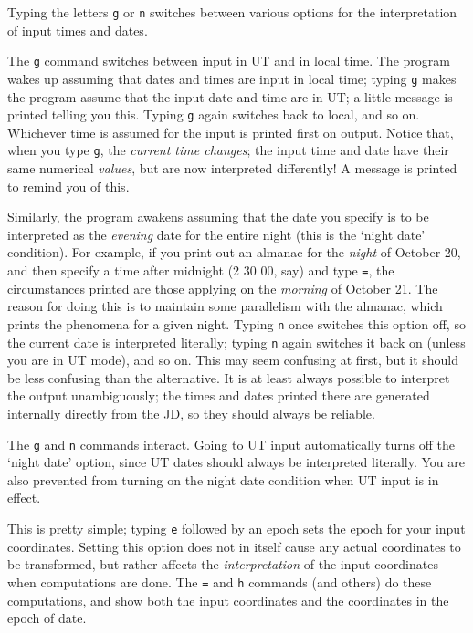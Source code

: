 
Typing the letters {\tt g} or {\tt n} switches between various options for
the interpretation of input times and dates.  

The {\tt g} command switches between input in UT and in local time.
The program wakes up assuming that dates and times are input
in local time; typing {\tt g} makes the program assume that the
input date and time are in UT; a little message is printed
telling you this.  Typing {\tt g} again switches back to local, and
so on.  Whichever time is assumed for the input is printed
first on output.  Notice that, when you type {\tt g}, the {\it current
time changes}; the input time and date have their same
numerical {\it values}, but are now interpreted differently!  A
message is printed to remind you of this.

Similarly, the program awakens assuming that the date you specify is
to be interpreted as the
{\it evening\/} date for the entire night (this is the `night date'
condition).  For example, if you
print out an almanac for the {\it night\/} of October 20, and then specify a
time after midnight (2 30 00, say) and type {\tt =}, the
circumstances printed are those applying on the {\it morning} of October 21.
The reason for doing this is to maintain some parallelism with the
almanac, which prints the phenomena for a given night.  Typing
{\tt n} once switches this option off, so the current date is interpreted
literally; typing {\tt n} again switches it back on (unless you are
in UT mode), and so on.  This may seem confusing at first, but it
should be less confusing than the alternative.  It is at least
always possible to interpret the output unambiguously; the times
and dates printed there are generated internally directly from the
JD, so they should always be reliable.

The {\tt g} and {\tt n} commands interact.  Going to UT input automatically
turns off the `night date' option, since UT dates should always be
interpreted literally.  You are also prevented from turning on the 
night date condition when UT input is in effect.

  
\par
{}

This is pretty simple; typing {\tt e} followed by an epoch
sets the epoch for your input coordinates.  Setting this
option does not in itself cause any actual coordinates to
be transformed, but rather affects the {\it interpretation}
of the input coordinates when computations are done. 
The {\tt =} and {\tt h} commands (and others) do these
computations, and show both the input coordinates
and the coordinates in the epoch of date.

